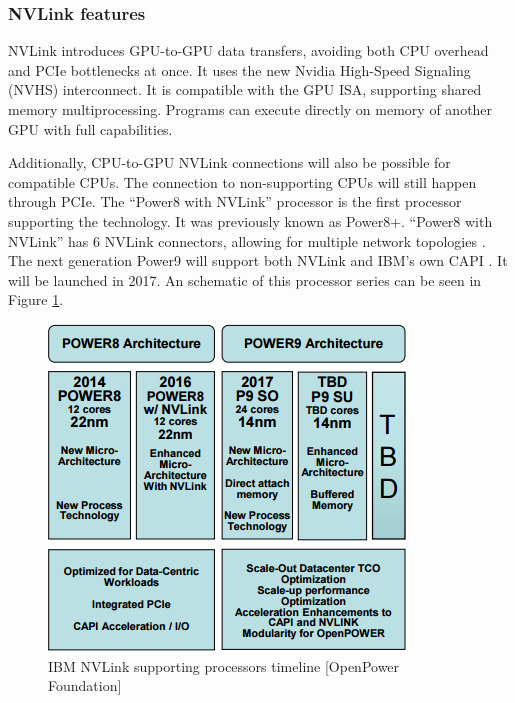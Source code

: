 \subsubsection{NVLink features}
NVLink introduces GPU-to-GPU data transfers, avoiding both CPU overhead and PCIe bottlenecks at once.
It uses the new Nvidia High-Speed Signaling (NVHS) interconnect.
It is compatible with the GPU ISA, supporting shared memory multiprocessing.
Programs can execute directly on memory of another GPU with full capabilities.

Additionally, CPU-to-GPU NVLink connections will also be possible for compatible CPUs.
The connection to non-supporting CPUs will still happen through PCIe.
The ``Power8 with NVLink'' processor is the first processor supporting the technology.
It was previously known as Power8+.
``Power8 with NVLink'' has 6 NVLink connectors, allowing for multiple network topologies \cite{openpower:roadmap}.
The next generation Power9 will support both NVLink and IBM's own CAPI \cite{openpower:interconnect2016}.
It will be launched in 2017.
An schematic of this processor series can be seen in Figure \ref{fig:nvlpower}.

\begin{figure}[ht!]
    \centering
    \includegraphics[width=\linewidth]{NVLink_Power}
    \caption{IBM NVLink supporting processors timeline [OpenPower Foundation]}
    \label{fig:nvlpower}
\end{figure}

